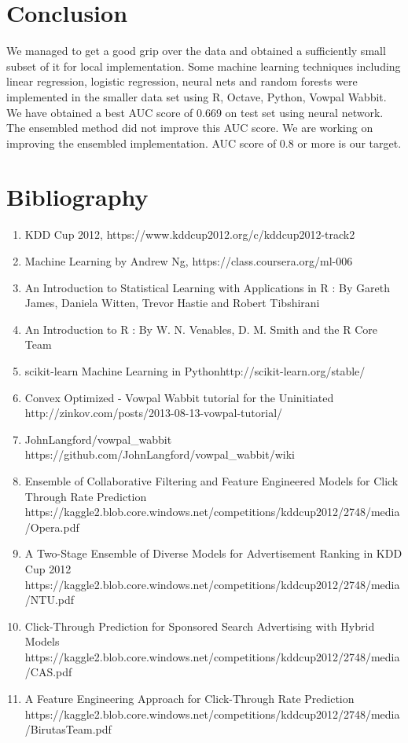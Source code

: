 \documentclass[10pt]{article}
\begin{document}
\section{Conclusion}
We managed to get a good grip over the data and obtained a sufficiently small subset of it for local implementation. Some machine learning techniques including linear regression, logistic regression, neural nets and random forests were implemented in the smaller data set using R, Octave, Python, Vowpal Wabbit. We have obtained a best AUC score of 0.669 on test set using neural network. The ensembled method did not improve this AUC score. We are working on improving the ensembled implementation. AUC score of 0.8 or more is our target.

\section{Bibliography}
\begin{enumerate}
	\item KDD Cup 2012, https://www.kddcup2012.org/c/kddcup2012-track2
	\item Machine Learning by Andrew Ng, https://class.coursera.org/ml-006
	\item An Introduction to Statistical Learning with Applications in R : By Gareth James, Daniela Witten, Trevor Hastie and Robert Tibshirani
	\item An Introduction to R : By W. N. Venables, D. M. Smith and the R Core Team
	\item scikit-learn Machine Learning in Pythonhttp://scikit-learn.org/stable/
	\item Convex Optimized - Vowpal Wabbit tutorial for the Uninitiated http://zinkov.com/posts/2013-08-13-vowpal-tutorial/
	\item JohnLangford/vowpal\_wabbit https://github.com/JohnLangford/vowpal\_wabbit/wiki
	\item Ensemble of Collaborative Filtering and Feature Engineered Models for Click Through Rate Prediction https://kaggle2.blob.core.windows.net/competitions/kddcup2012/2748/media/Opera.pdf
	\item A Two-Stage Ensemble of Diverse Models for Advertisement Ranking in KDD Cup 2012 https://kaggle2.blob.core.windows.net/competitions/kddcup2012/2748/media/NTU.pdf
	\item Click-Through Prediction for Sponsored Search Advertising with Hybrid Models https://kaggle2.blob.core.windows.net/competitions/kddcup2012/2748/media/CAS.pdf
	\item A Feature Engineering Approach for Click-Through Rate Prediction https://kaggle2.blob.core.windows.net/competitions/kddcup2012/2748/media/BirutasTeam.pdf
\end{enumerate}
	

\nocite{*}		

		
\end{document}
